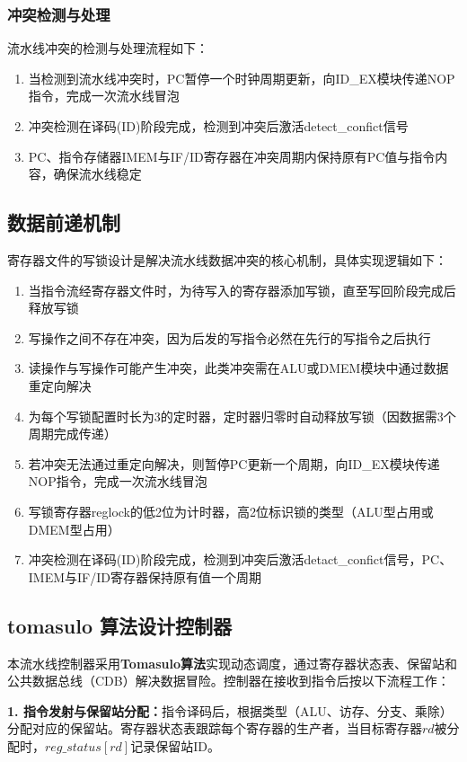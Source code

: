 \documentclass[12pt,a4paper]{article}
\begin{document}
\subsubsection{冲突检测与处理}
流水线冲突的检测与处理流程如下：
\begin{enumerate}
\item 当检测到流水线冲突时，PC暂停一个时钟周期更新，向ID\_EX模块传递NOP指令，完成一次流水线冒泡
\item 冲突检测在译码(ID)阶段完成，检测到冲突后激活detect\_confict信号
\item PC、指令存储器IMEM与IF/ID寄存器在冲突周期内保持原有PC值与指令内容，确保流水线稳定
\end{enumerate}

\subsection{数据前递机制}

寄存器文件的写锁设计是解决流水线数据冲突的核心机制，具体实现逻辑如下：

\begin{enumerate}
\item 当指令流经寄存器文件时，为待写入的寄存器添加写锁，直至写回阶段完成后释放写锁
\item 写操作之间不存在冲突，因为后发的写指令必然在先行的写指令之后执行
\item 读操作与写操作可能产生冲突，此类冲突需在ALU或DMEM模块中通过数据重定向解决
\item 为每个写锁配置时长为3的定时器，定时器归零时自动释放写锁（因数据需3个周期完成传递）
\item 若冲突无法通过重定向解决，则暂停PC更新一个周期，向ID\_EX模块传递NOP指令，完成一次流水线冒泡
\item 写锁寄存器reglock的低2位为计时器，高2位标识锁的类型（ALU型占用或DMEM型占用）
\item 冲突检测在译码(ID)阶段完成，检测到冲突后激活detact\_confict信号，PC、IMEM与IF/ID寄存器保持原有值一个周期
\end{enumerate}

\subsection{tomasulo 算法设计控制器}

本流水线控制器采用\textbf{Tomasulo算法}实现动态调度，通过寄存器状态表、保留站和公共数据总线（CDB）解决数据冒险。控制器在接收到指令后按以下流程工作：

\textbf{1. 指令发射与保留站分配：}指令译码后，根据类型（ALU、访存、分支、乘除）分配对应的保留站。寄存器状态表跟踪每个寄存器的生产者，当目标寄存器$rd$被分配时，$reg\_status[rd]$记录保留站ID。
\end{document}
